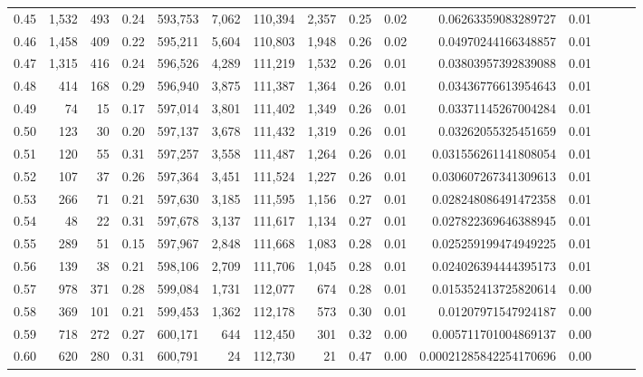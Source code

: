 \begin{tabular}{rrrrrrrrrrrrrrr}
0.45 &   1,532 &    493 &  0.24 &  593,753 &    7,062 &  110,394 &    2,357 &  0.25 &  0.02 &     0.06263359083289727 &      0.01 \\
0.46 &   1,458 &    409 &  0.22 &  595,211 &    5,604 &  110,803 &    1,948 &  0.26 &  0.02 &     0.04970244166348857 &      0.01 \\
0.47 &   1,315 &    416 &  0.24 &  596,526 &    4,289 &  111,219 &    1,532 &  0.26 &  0.01 &     0.03803957392839088 &      0.01 \\
0.48 &     414 &    168 &  0.29 &  596,940 &    3,875 &  111,387 &    1,364 &  0.26 &  0.01 &     0.03436776613954643 &      0.01 \\
0.49 &      74 &     15 &  0.17 &  597,014 &    3,801 &  111,402 &    1,349 &  0.26 &  0.01 &     0.03371145267004284 &      0.01 \\
0.50 &     123 &     30 &  0.20 &  597,137 &    3,678 &  111,432 &    1,319 &  0.26 &  0.01 &     0.03262055325451659 &      0.01 \\
0.51 &     120 &     55 &  0.31 &  597,257 &    3,558 &  111,487 &    1,264 &  0.26 &  0.01 &    0.031556261141808054 &      0.01 \\
0.52 &     107 &     37 &  0.26 &  597,364 &    3,451 &  111,524 &    1,227 &  0.26 &  0.01 &    0.030607267341309613 &      0.01 \\
0.53 &     266 &     71 &  0.21 &  597,630 &    3,185 &  111,595 &    1,156 &  0.27 &  0.01 &    0.028248086491472358 &      0.01 \\
0.54 &      48 &     22 &  0.31 &  597,678 &    3,137 &  111,617 &    1,134 &  0.27 &  0.01 &    0.027822369646388945 &      0.01 \\
0.55 &     289 &     51 &  0.15 &  597,967 &    2,848 &  111,668 &    1,083 &  0.28 &  0.01 &    0.025259199474949225 &      0.01 \\
0.56 &     139 &     38 &  0.21 &  598,106 &    2,709 &  111,706 &    1,045 &  0.28 &  0.01 &    0.024026394444395173 &      0.01 \\
0.57 &     978 &    371 &  0.28 &  599,084 &    1,731 &  112,077 &      674 &  0.28 &  0.01 &    0.015352413725820614 &      0.00 \\
0.58 &     369 &    101 &  0.21 &  599,453 &    1,362 &  112,178 &      573 &  0.30 &  0.01 &     0.01207971547924187 &      0.00 \\
0.59 &     718 &    272 &  0.27 &  600,171 &      644 &  112,450 &      301 &  0.32 &  0.00 &    0.005711701004869137 &      0.00 \\
0.60 &     620 &    280 &  0.31 &  600,791 &       24 &  112,730 &       21 &  0.47 &  0.00 &  0.00021285842254170696 &      0.00 \\

\end{tabular}
